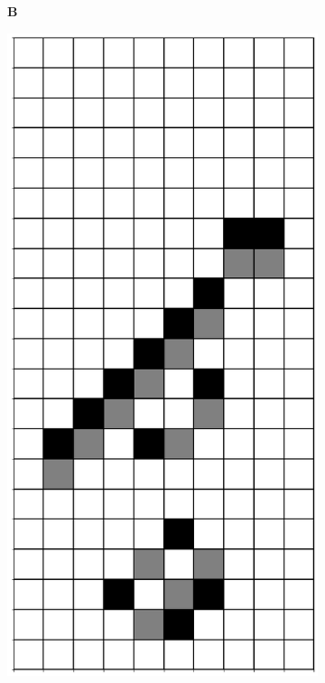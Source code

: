 \documentclass[12pt]{article}
\numberwithin{figure}{section} %
\begin{document}
\begin{figure}[H]
\begin{subfigure}{0.3\textwidth}
     		\subcaption{}
   	\end{subfigure}
      	\newline
	\begin{subfigure}[t]{0.03\textwidth}
		\textbf{B}
  	\end{subfigure}	
        	\begin{subfigure}{0.3\textwidth}
     		\centering
     		\includegraphics[angle=270,width=\linewidth]{Section4/23.3}

\end{subfigure}
\end{figure}
\end{document}
